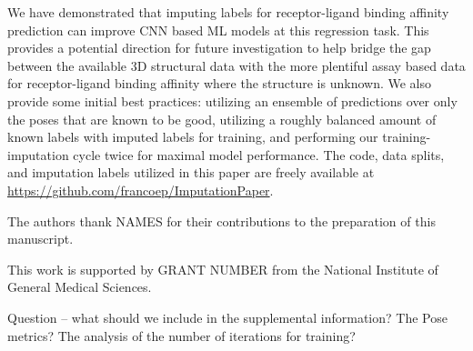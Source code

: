\documentclass[journal=jmcmar,manuscript=article]{achemso}
\begin{document}
We have demonstrated that imputing labels for receptor-ligand binding affinity prediction can improve CNN based ML models at this regression task.
This provides a potential direction for future investigation to help bridge the gap between the available 3D structural data with the more plentiful assay based data for receptor-ligand binding affinity where the structure is unknown.
We also provide some initial best practices: utilizing an ensemble of predictions over only the poses that are known to be good, utilizing a roughly balanced amount of known labels with imputed labels for training, and performing our training-imputation cycle twice for maximal model performance.
The code, data splits, and imputation labels utilized in this paper are freely available at \url{https://github.com/francoep/ImputationPaper}.


\begin{acknowledgement}

The authors thank NAMES for their contributions to the preparation of this manuscript.

This work is supported by GRANT NUMBER from the National Institute of General Medical Sciences.

\end{acknowledgement}

\begin{suppinfo}

Question -- what should we include in the supplemental information? The Pose metrics? The analysis of the number of iterations for training?
\end{suppinfo}


\end{document}
